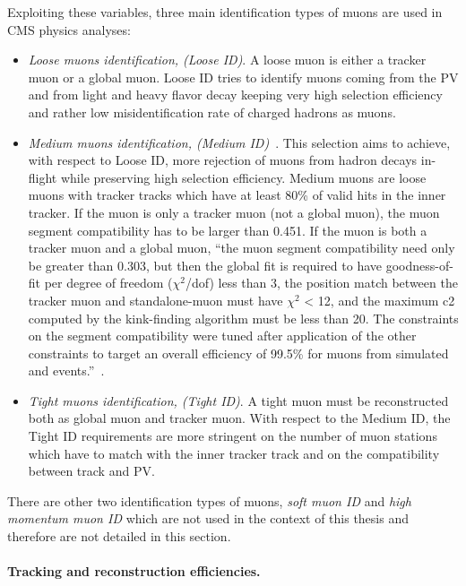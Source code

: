 Exploiting these variables, three main identification types of muons
are used in CMS physics analyses:
\begin{itemize}
\setlength\itemsep{-0.2em}
\item \emph{Loose muons identification, (Loose ID)}. A loose muon is either a
  tracker muon or a global muon. Loose ID tries to identify muons
  coming from the PV and from light and heavy flavor decay keeping
  very high selection efficiency and rather low misidentification rate
  of charged hadrons as muons. 
\item \emph{Medium muons identification, (Medium
    ID)}~\cite{PetruccianiBotta}. This selection aims to achieve, with
  respect to Loose ID, more rejection	
of muons from hadron decays in-flight while preserving
high selection efficiency. Medium muons are loose muons with tracker
tracks which have at least 80\% of valid hits in the inner tracker. 
If the muon is only a tracker muon (not a global muon), the muon
segment compatibility has to be larger than
0.451. If the muon is both a tracker muon and a global muon, ``the
muon segment compatibility need only be greater than 0.303, but then the global fit
is required to have goodness-of-fit per degree of freedom ($\chi^2$/dof) less than 3, the
position match between the tracker muon and standalone-muon must have $\chi^2$ < 12,
and the maximum c2 computed by the kink-finding algorithm must be less than 20.
The constraints on the segment compatibility were tuned after application of the
other constraints to target an overall efficiency of 99.5\% for muons from simulated
\PW and \PZ events.''~\cite{Sirunyan_2018_muon}.
\item \emph{Tight muons identification, (Tight ID)}. A tight muon must
  be reconstructed both as global muon and tracker muon. With respect
  to the Medium ID, the Tight ID requirements are more stringent on
  the number of muon stations which have to match with the inner
  tracker track and on the compatibility between track and PV. 
\end{itemize}
There are other two identification types of muons, \emph{soft muon ID}
and \emph{high momentum muon ID} which are not used in the context of
this thesis and therefore are not detailed in this section. 


\paragraph{Tracking and reconstruction
  efficiencies.}\label{sec:c2effmuon}

